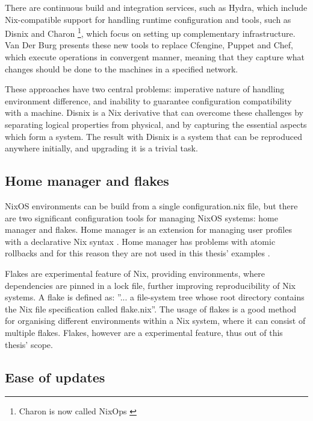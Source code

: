 There are continuous build and integration services, such as Hydra,
which include Nix-compatible support for handling runtime
configuration and tools, such as Disnix and Charon \footnote{Charon is
now called NixOps \cite{githubNixNixpkgsNixOS}}, which focus on
setting up complementary infrastructure. Van Der Burg presents these
new tools to replace Cfengine, Puppet and Chef, which execute
operations in convergent manner, meaning that they capture what
changes should be done to the machines in a specified
network. \cite{van2013reference}

These approaches have two central problems: imperative nature of
handling environment difference, and inability to guarantee
configuration compatibility with a machine. Disnix is a Nix derivative
that can overcome these challenges by separating logical properties
from physical, and by capturing the essential aspects which form a
system. The result with Disnix is a system that can be reproduced
anywhere initially, and upgrading it is a trivial
task. \cite{van2013reference}

\subsection{Home manager and flakes}

NixOS environments can be build from a single configuration.nix file,
but there are two significant configuration tools for managing NixOS
systems: home manager and flakes. Home manager is an extension for
managing user profiles with a declarative Nix syntax
\cite{nixcommunityHomeManager}. Home manager has problems with atomic
rollbacks and for this reason they are not used in this thesis'
examples \cite{nixcommunityHomeManager}.

Flakes are experimental feature of Nix, providing environments, where
dependencies are pinned in a lock file, further improving
reproducibility of Nix systems. A flake is defined as: ''... a
file-system tree whose root directory contains the Nix file
specification called flake.nix''. The usage of flakes is a good method
for organising different environments within a Nix system, where it
can consist of multiple flakes. Flakes, however are a experimental
feature, thus out of this thesis' scope. \cite{nixosFlakesNixOS}
\subsection{Ease of updates}

